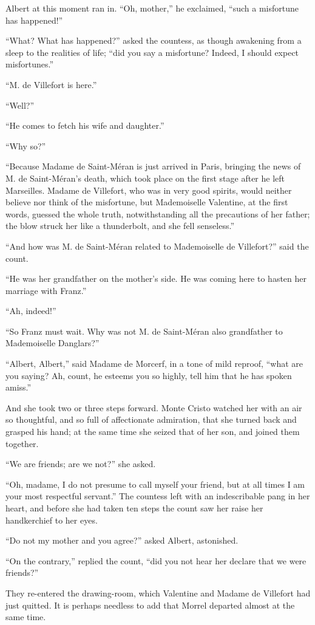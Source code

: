 Albert at this moment ran in. “Oh, mother,” he exclaimed, “such a
misfortune has happened!”

“What? What has happened?” asked the countess, as though awakening from
a sleep to the realities of life; “did you say a misfortune? Indeed, I
should expect misfortunes.”

“M. de Villefort is here.”

“Well?”

“He comes to fetch his wife and daughter.”

“Why so?”

“Because Madame de Saint-Méran is just arrived in Paris, bringing the
news of M. de Saint-Méran’s death, which took place on the first stage
after he left Marseilles. Madame de Villefort, who was in very good
spirits, would neither believe nor think of the misfortune, but
Mademoiselle Valentine, at the first words, guessed the whole truth,
notwithstanding all the precautions of her father; the blow struck her
like a thunderbolt, and she fell senseless.”

“And how was M. de Saint-Méran related to Mademoiselle de Villefort?”
said the count.

“He was her grandfather on the mother’s side. He was coming here to
hasten her marriage with Franz.”

“Ah, indeed!”

“So Franz must wait. Why was not M. de Saint-Méran also grandfather to
Mademoiselle Danglars?”

“Albert, Albert,” said Madame de Morcerf, in a tone of mild reproof,
“what are you saying? Ah, count, he esteems you so highly, tell him
that he has spoken amiss.”

And she took two or three steps forward. Monte Cristo watched her with
an air so thoughtful, and so full of affectionate admiration, that she
turned back and grasped his hand; at the same time she seized that of
her son, and joined them together.

“We are friends; are we not?” she asked.

“Oh, madame, I do not presume to call myself your friend, but at all
times I am your most respectful servant.” The countess left with an
indescribable pang in her heart, and before she had taken ten steps the
count saw her raise her handkerchief to her eyes.

“Do not my mother and you agree?” asked Albert, astonished.

“On the contrary,” replied the count, “did you not hear her declare
that we were friends?”

They re-entered the drawing-room, which Valentine and Madame de
Villefort had just quitted. It is perhaps needless to add that Morrel
departed almost at the same time.
